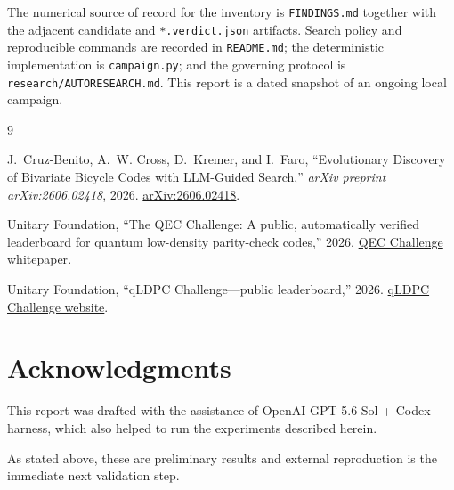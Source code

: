 \documentclass[11pt]{article}
\newcommand{\pathcode}[1]{\nolinkurl{#1}}
\begin{document}
The numerical source of record for the inventory is
\pathcode{FINDINGS.md} together with the adjacent candidate and
\pathcode{*.verdict.json} artifacts.  Search policy and reproducible commands
are recorded in \pathcode{README.md}; the deterministic implementation is
\pathcode{campaign.py}; and the governing protocol is
\pathcode{research/AUTORESEARCH.md}.  This report is a dated snapshot of an
ongoing local campaign.

\vspace{-0.4em}
\begin{thebibliography}{9}
\setlength{\itemsep}{0.15em}

J.~Cruz-Benito, A.~W. Cross, D.~Kremer, and I.~Faro,
``Evolutionary Discovery of Bivariate Bicycle Codes with LLM-Guided Search,''
\emph{arXiv preprint arXiv:2606.02418}, 2026.
\href{https://arxiv.org/abs/2606.02418}{arXiv:2606.02418}.

Unitary Foundation,
``The QEC Challenge: A public, automatically verified leaderboard for quantum
low-density parity-check codes,'' 2026.
\href{https://github.com/unitaryfoundation/qldpc-challenge/blob/main/docs/qec_challenge.pdf}%
{QEC Challenge whitepaper}.

Unitary Foundation,
``qLDPC Challenge---public leaderboard,'' 2026.
\href{https://unitaryfoundation.github.io/qldpc-challenge/index.html}%
{qLDPC Challenge website}.

\end{thebibliography}

\vspace{-0.5em}
\section*{Acknowledgments}

This report was drafted with the assistance of OpenAI GPT-5.6 Sol + Codex
harness, which also helped to run the experiments described herein.

As stated above, these are preliminary results and external reproduction is
the immediate next validation step.
\end{document}

